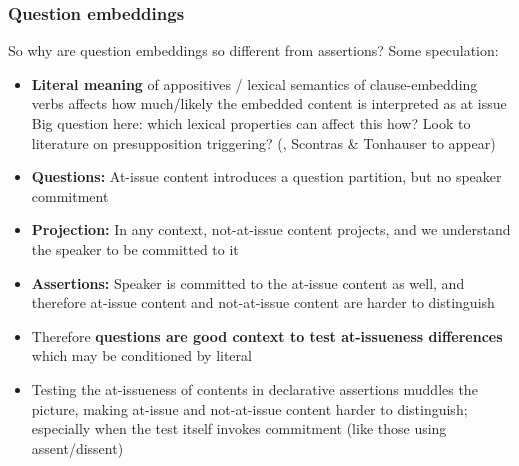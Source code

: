 \documentclass[compress, xcolor = dvipsnames, aspectratio=169]{beamer}
\begin{document}
	\begin{frame}[t]\frametitle{Question embeddings}\small 
		So why are question embeddings so different from assertions? Some speculation:\pause

		\begin{itemize}[<+->]
			\item \textbf{Literal meaning} of appositives / lexical semantics of clause-embedding verbs affects how much/likely the embedded content is interpreted as at issue\\ 
			{\scriptsize Big question here: which lexical properties can affect this how? Look to literature on presupposition triggering? (\citealt{abrusan_predicting_2011,schlenker_triggering_2021,anand_facts_2024}, Scontras \& Tonhauser to appear)}

			\item \textbf{Questions:} At-issue content introduces a question partition, but no speaker commitment

			\item \textbf{Projection:} In any context, not-at-issue content projects, and we understand the speaker to be committed to it

			\item \textbf{Assertions:} Speaker is committed to the at-issue content as well, and therefore at-issue content and not-at-issue content are harder to distinguish

			\item Therefore \textbf{questions are good context to test at-issueness differences} which may be conditioned by literal

			\item Testing the at-issueness of contents in declarative assertions muddles the picture, making at-issue and not-at-issue content harder to distinguish; especially when the test itself invokes commitment (like those using assent/dissent)

		\end{itemize}
	
	\end{frame}
	
\end{document}
